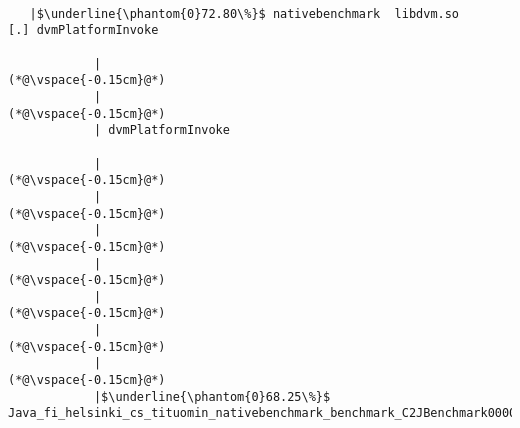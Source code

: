 
\begin{lstlisting}[caption=Staattinen metodi C$\to$Java , label=profile:C2JBenchmark00001, numberbychapter=true, frame=lines, float, floatplacement=t]

   |$\underline{\phantom{0}72.80\%}$ nativebenchmark  libdvm.so           [.] dvmPlatformInvoke

            |
(*@\vspace{-0.15cm}@*)
            |
(*@\vspace{-0.15cm}@*)
            | dvmPlatformInvoke

            |
(*@\vspace{-0.15cm}@*)
            |
(*@\vspace{-0.15cm}@*)
            |
(*@\vspace{-0.15cm}@*)
            |
(*@\vspace{-0.15cm}@*)
            |
(*@\vspace{-0.15cm}@*)
            |
(*@\vspace{-0.15cm}@*)
            |
(*@\vspace{-0.15cm}@*)
            |$\underline{\phantom{0}68.25\%}$ Java_fi_helsinki_cs_tituomin_nativebenchmark_benchmark_C2JBenchmark00001_runInternal


\end{lstlisting}
